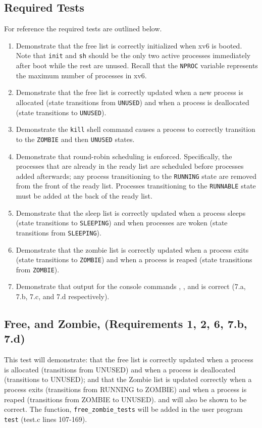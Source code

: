 \documentclass[11pt,letterpaper]{report}
\begin{document}
	\subsection*{Required Tests}
	For reference the required tests are outlined below.
 	\begin{enumerate}
		\item Demonstrate that the free list is correctly initialized when xv6 is booted. Note that {\tt init} and {\tt sh} should be the only two active processes immediately after boot while the rest are unused. Recall that the {\tt NPROC} variable represents the maximum number of processes in xv6.
	
		\item Demonstrate that the free list is correctly updated when a new process is allocated (state transitions from {\tt UNUSED}) and when a process is deallocated (state transitions to {\tt UNUSED}).
	
		\item Demonstrate the {\tt kill} shell command causes a process to correctly transition to the {\tt ZOMBIE}  and then {\tt UNUSED} states. 
	
		\item Demonstrate that round-robin scheduling is enforced. Specifically, the processes that are  already in the ready list are scheduled before processes added afterwards; any process transitioning to the {\tt RUNNING} state are removed from the front of the ready list. Processes transitioning to the {\tt RUNNABLE} state must be added at the back of the ready list.
	
		\item Demonstrate that the sleep list is correctly updated when a process sleeps (state transitions to  {\tt SLEEPING})  and when processes are woken (state transitions from {\tt SLEEPING}).
	
		\item Demonstrate that the zombie list is correctly updated when a process exits (state transitions to {\tt ZOMBIE}) and when a process is reaped (state transitions from  {\tt ZOMBIE}).
	
		\item Demonstrate that output for the console commands , ,  and  is correct (7.a, 7.b, 7.c, and 7.d respectively).
	\end{enumerate}
	
	\subsection*{Free,  and Zombie,   (Requirements 1, 2, 6, 7.b, 7.d)}
	This test will demonstrate: that the free list is correctly updated when a process is allocated (transitions from UNUSED) and when a process is deallocated  (transitions to UNUSED); and that the Zombie list is updated correctly when a process exits (transitions from RUNNING to ZOMBIE) and when a process is reaped (transitions from ZOMBIE to UNUSED).  and  will also be shown to be correct. The function, {\tt free\_zombie\_tests} will be added in the user program {\tt test} (test.c lines 107-169).
	
\end{document}
